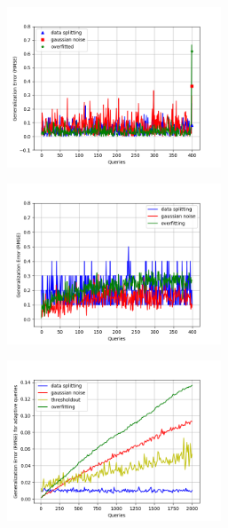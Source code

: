 {\small
\begin{figure}
\centering
\begin{subfigure}{.322\textwidth}
\begin{centering}
\includegraphics[width=0.7\textwidth]{tworound.png}
\caption{}
\end{centering}
\end{subfigure}
\quad
\begin{subfigure}{.322\textwidth}
\begin{centering}
\includegraphics[width=0.7\textwidth]{multipleround.png}
\caption{}
\end{centering}
\end{subfigure}
\begin{subfigure}{.322\textwidth}
\begin{centering}
\includegraphics[width=0.7\textwidth]{twoRounds-rmse-fourmechs.png}

\end{centering}
\end{subfigure}
\end{figure}}
